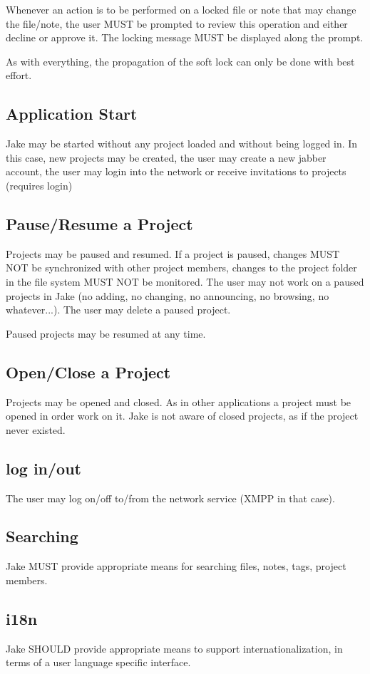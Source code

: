 Whenever an action is to be performed on a locked file or note that may change the file/note, the user MUST be prompted to review this operation and either decline or approve it. The locking message MUST be displayed along the prompt.

As with everything, the propagation of the soft lock can only be done with best effort.

\subsection{Application Start}
Jake may be started without any project loaded and without being logged in. In this case, new projects may be created, the user may create a new jabber account, the user may login into the network or receive invitations to projects (requires login)

\subsection{Pause/Resume a Project}
Projects may be paused and resumed. If a project is paused, changes MUST NOT be synchronized with other project members, changes to the project folder in the file system MUST NOT be monitored. The user may not work on a paused projects in Jake (no adding, no changing, no announcing, no browsing, no whatever...). The user may delete a paused project.

Paused projects may be resumed at any time.

\subsection{Open/Close a Project}
Projects may be opened and closed. As in other applications a project must be opened in order work on it. Jake is not aware of closed projects, as if the project never existed.

\subsection{log in/out}
The user may log on/off to/from the network service (XMPP in that case).

\subsection{Searching}
Jake MUST provide appropriate means for searching files, notes, tags, project members.

\subsection{i18n}
Jake SHOULD provide appropriate means to support internationalization, in terms of a user language specific interface.

